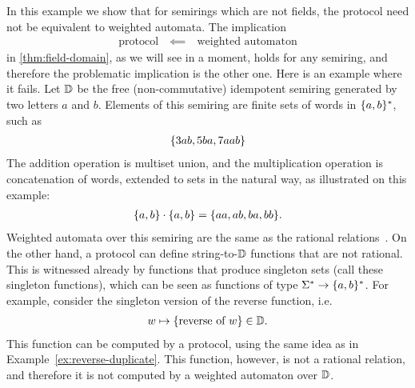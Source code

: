 \begin{myexample}
    \label{ex:non-commutative-semirings} In this example we show that for semirings which are not fields, the protocol need not be equivalent to weighted automata.  The implication 
    \begin{align*}
    \text{protocol} \quad \impliedby \quad \text{weighted automaton}
    \end{align*}
    in \cref{thm:field-domain}, as we will see in a moment, holds for any semiring, and therefore the problematic implication is the other one. Here is an example where it fails.
    Let $\mathbb D$ be  the free (non-commutative) idempotent semiring generated by two letters $a$ and $b$. Elements of this semiring are finite sets of words in $\{a,b\}^*$, such as 
    \begin{align*}
    \{3ab, 5ba, 7aab\}
    \end{align*}
    The addition operation is multiset union, and the multiplication operation is concatenation of words, extended to sets in the natural way, as illustrated on this example:
    \begin{align*}
    \{a,b\}\cdot \{a,b\} = \{aa, ab, ba, bb\}.
    \end{align*}
    Weighted automata over this semiring are the same as the rational relations~\cite[Chapter IX]{Eilenberg74}. On the other hand, a protocol can define string-to-$\mathbb D$ functions that are not rational. This is witnessed already by functions that produce singleton sets (call these singleton functions), which can be seen as functions of type $\Sigma^* \to \{a,b\}^*$. For example, consider the singleton version of the  reverse function, i.e.
    \begin{align*}
    w \mapsto \{\text{reverse of $w$}\} \in \mathbb D.
    \end{align*}
    This function can be computed by a protocol, using the same idea as in Example~\ref{ex:reverse-duplicate}. This function, however, is not a rational relation, and therefore it is not computed by a weighted automaton over $\mathbb D$. 

\end{myexample}
